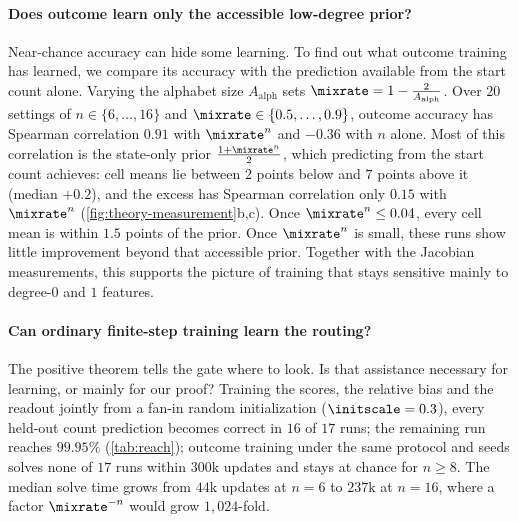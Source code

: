\paragraph{Does outcome learn only the accessible low-degree prior?} Near-chance accuracy can hide some learning. To find out what
outcome training has learned, we compare its accuracy with the prediction available from the start count alone. Varying the alphabet size $A_{\mathrm{alph}}$ sets $\mixrate=1-\frac{2}{A_{\mathrm{alph}}}$. Over $20$ settings
of $n\in\{6,\ldots,16\}$ and $\mixrate\in\{0.5,\ldots,0.9\}$, outcome accuracy has Spearman correlation $0.91$ with
$\mixrate^n$ and $-0.36$ with $n$ alone. Most of this correlation is the state-only prior $\frac{1+\mixrate^n}{2}$, which predicting
from the start count achieves: cell means lie between $2$ points below and $7$ points above it (median $+0.2$), and the excess
has Spearman correlation only $0.15$ with $\mixrate^n$ (\cref{fig:theory-measurement}b,c). Once $\mixrate^n\le0.04$, every
cell mean is within $1.5$ points of the prior. Once $\mixrate^n$ is small, these runs show little improvement beyond that accessible prior. Together with the Jacobian measurements,
this supports the picture of training that stays sensitive mainly to degree-$0$ and $1$ features.

\paragraph{Can ordinary finite-step training learn the routing?} The positive theorem tells the gate where to look. Is that assistance
necessary for learning, or mainly for our proof? Training the scores, the relative bias and the readout jointly from a fan-in
random initialization ($\initscale=0.3$), every held-out count prediction becomes correct in $16$ of $17$ runs; the
remaining run reaches $99.95\%$ (\cref{tab:reach}); outcome training under the same protocol and seeds solves none of $17$
runs within $300$k updates and stays at chance for $n\ge8$. The median solve time grows from $44$k updates at $n=6$ to $237$k at
$n=16$, where a factor $\mixrate^{-n}$ would grow $1{,}024$-fold.

